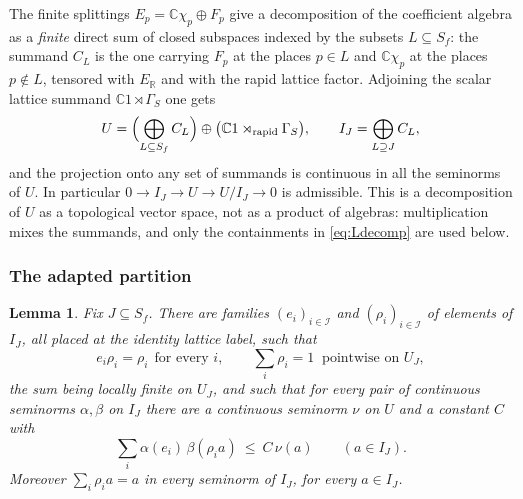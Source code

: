 \documentclass[11pt]{amsart}
\newtheorem{lemma}[theorem]{Lemma}
\theoremstyle{definition}
\theoremstyle{remark}
\newcommand{\C}{\mathbb C}
\newcommand{\R}{\mathbb R}
\begin{document}
The finite splittings $E_p=\C\chi_p\oplus F_p$ give a decomposition of the
coefficient algebra as a \emph{finite} direct sum of closed subspaces indexed
by the subsets $L\subseteq S_f$: the summand $C_L$ is the one carrying $F_p$ at
the places $p\in L$ and $\C\chi_p$ at the places $p\notin L$, tensored with
$E_{\R}$ and with the rapid lattice factor.  Adjoining the scalar lattice
summand $\C1\rtimes\Gamma_S$ one gets
\begin{equation}\label{eq:Ldecomp}
U=\Bigl(\bigoplus_{L\subseteq S_f}C_L\Bigr)\oplus\bigl(\C1
\rtimes_{\mathrm{rapid}}\Gamma_S\bigr),\qquad
I_J=\bigoplus_{L\supseteq J}C_L ,
\end{equation}
and the projection onto any set of summands is continuous in all the seminorms
of $U$.  In particular $0\to I_J\to U\to U/I_J\to0$ is admissible.  This is a
decomposition of $U$ as a topological vector space, not as a product of
algebras: multiplication mixes the summands, and only the containments in
\eqref{eq:Ldecomp} are used below.

\subsubsection*{The adapted partition}

\begin{lemma}\label{lem:partition}
Fix $J\subseteq S_f$.  There are families $(e_i)_{i\in\mathcal I}$ and
$(\rho_i)_{i\in\mathcal I}$ of elements of $I_J$, all placed at the identity
lattice label, such that
\begin{equation}\label{eq:partition}
e_i\rho_i=\rho_i\ \ \text{for every }i,\qquad
\sum_i\rho_i=1\ \text{ pointwise on }U_J ,
\end{equation}
the sum being locally finite on $U_J$, and such that for every pair of
continuous seminorms $\alpha,\beta$ on $I_J$ there are a continuous seminorm
$\nu$ on $U$ and a constant $C$ with
\begin{equation}\label{eq:summable}
\sum_i\alpha(e_i)\,\beta(\rho_i a)\ \le\ C\,\nu(a)\qquad(a\in I_J).
\end{equation}
Moreover $\sum_i\rho_ia=a$ in every seminorm of $I_J$, for every $a\in I_J$.
\end{lemma}
\end{document}
